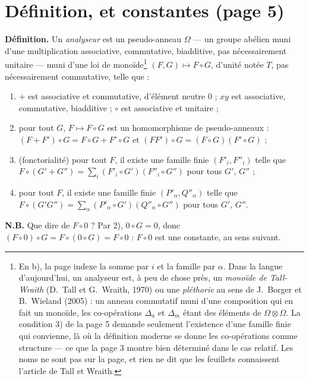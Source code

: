 \documentclass[11pt,a4paper]{article}
\begin{document}
\section*{Définition, et constantes (page 5)}

\textbf{Définition.} Un \emph{analyseur} est un pseudo-anneau $\Omega$ --- un
groupe abélien muni d'une multiplication associative, commutative, biadditive,
pas nécessairement unitaire --- muni d'une loi de monoïde\footnote{En b), la page indexe la somme par $i$ et la famille par $\alpha$. Dans
la langue d'aujourd'hui, un analyseur est, à peu de chose près, un
\emph{monoïde de Tall-Wraith} (D.~Tall et G.~Wraith, 1970) ou une
\emph{pléthorie} au sens de J.~Borger et B.~Wieland (2005) : un anneau
commutatif muni d'une composition qui en fait un monoïde, les co-opérations
$\Delta_{a}$ et $\Delta_{m}$ étant des éléments de $\Omega \otimes \Omega$. La
condition 3) de la page 5 demande seulement l'existence d'une famille finie
qui convienne, là où la définition moderne se donne les co-opérations comme
structure --- ce que la page 3 montre bien déterminé dans le cas relatif. Les
noms ne sont pas sur la page, et rien ne dit que les feuillets connaissent
l'article de Tall et Wraith.}
$(F, G) \mapsto F \circ G$, d'unité notée $T$, pas nécessairement commutative,
telle que :
\begin{enumerate}
\item[1)] $+$ est associative et commutative, d'élément neutre $0$ ; $xy$ est
associative, commutative, biadditive ; $\circ$ est associative et unitaire ;
\item[2)] pour tout $G$, $F \mapsto F \circ G$ est un homomorphisme de
pseudo-anneaux :
$(F + F') \circ G = F \circ G + F' \circ G$ et $(FF') \circ G = (F \circ G)(F'
\circ G)$ ;
\item[3a)] (fonctorialité) pour tout $F$, il existe une famille finie $(F'_{i}, F''_{i})$ telle
que $F \circ (G' + G'') = \sum_{i} (F'_{i} \circ G')(F''_{i} \circ G'')$ pour
tous $G'$, $G''$ ;
\item[3b)] pour tout $F$, il existe une famille finie $(P'_{\alpha},
Q''_{\alpha})$ telle que $F \circ (G'G'') = \sum_{\alpha} (P'_{\alpha} \circ
G')(Q''_{\alpha} \circ G'')$ pour tous $G'$, $G''$.
\end{enumerate}

\textbf{N.B.} Que dire de $F \circ 0$ ? Par 2), $0 \circ G = 0$, donc
$(F \circ 0) \circ G = F \circ (0 \circ G) = F \circ 0$ : $F \circ 0$ est une
constante, au sens suivant.
\end{document}
